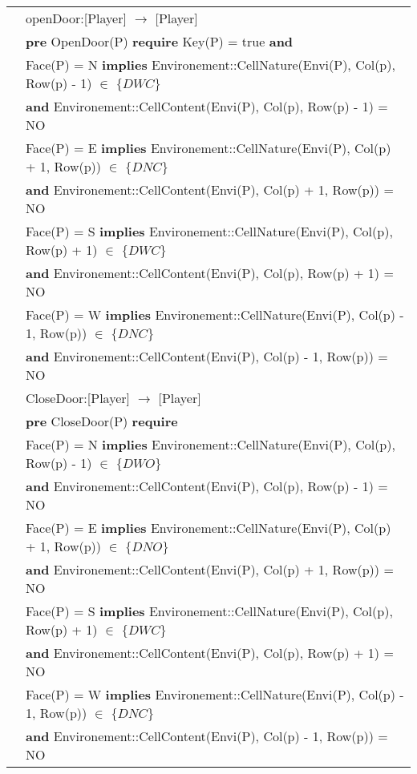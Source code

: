 \begin{tabular}{rl}
& \quad openDoor:[Player] $\rightarrow$ [Player]\\
& 
\quad\quad \textbf{pre} OpenDoor(P) \textbf{require} Key(P) = true \textbf{and}\\
& 
\quad\quad\quad 
Face(P) = N  \textbf{implies}  Environement::CellNature(Envi(P), Col(p), Row(p) - 1) $\in$ $\{ DWC\}$ \\
& \quad\quad \textbf{and}  Environement::CellContent(Envi(P), Col(p), Row(p) - 1) = NO\\
[0.2cm]
& 
\quad\quad\quad Face(P) = E \textbf{implies} Environement::CellNature(Envi(P), Col(p) + 1, Row(p)) $\in$ $\{ DNC\}$ \\
& \quad\quad  \textbf{and}  Environement::CellContent(Envi(P), Col(p) + 1, Row(p)) = NO\\
[0.2cm]
& \quad\quad\quad Face(P) = S \textbf{implies} Environement::CellNature(Envi(P), Col(p), Row(p) + 1) $\in$ $\{ DWC\}$\\
&
\quad\quad \textbf{and}  Environement::CellContent(Envi(P), Col(p), Row(p) + 1) = NO\\
[0.2cm]
& 
\quad\quad\quad Face(P) = W \textbf{implies} Environement::CellNature(Envi(P), Col(p) - 1, Row(p)) $\in$ $\{ DNC\}$ \\
&
\quad\quad \textbf{and}  Environement::CellContent(Envi(P), Col(p) - 1, Row(p)) = NO\\
[0.5cm]
& \quad CloseDoor:[Player] $\rightarrow$ [Player]\\
&
\quad\quad \textbf{pre} CloseDoor(P) \textbf{require} \\
[0.2cm]
&
\quad\quad Face(P) = N \textbf{implies} Environement::CellNature(Envi(P), Col(p), Row(p) - 1) $\in$ $\{ DWO\}$ \\
&
\textbf{and}  Environement::CellContent(Envi(P), Col(p), Row(p) - 1) = NO\\
[0.2cm]
&
\quad\quad\quad Face(P) = E \textbf{implies} Environement::CellNature(Envi(P), Col(p) + 1, Row(p)) $\in$ $\{ DNO\}$ \\
&
\quad\quad \textbf{and}  Environement::CellContent(Envi(P), Col(p) + 1, Row(p)) = NO\\
[0.2cm]
&
\quad\quad\quad Face(P) = S \textbf{implies} Environement::CellNature(Envi(P), Col(p), Row(p) + 1) $\in$ $\{ DWC\}$ 
\\&
\quad\quad \textbf{and}  Environement::CellContent(Envi(P), Col(p), Row(p) + 1) = NO\\
[0.2cm]
&
\quad\quad\quad Face(P) = W \textbf{implies} Environement::CellNature(Envi(P), Col(p) - 1, Row(p)) $\in$ $\{DNC\}$ \\
&
\quad\quad\textbf{and}  Environement::CellContent(Envi(P), Col(p) - 1, Row(p)) = NO

\end{tabular}\\
